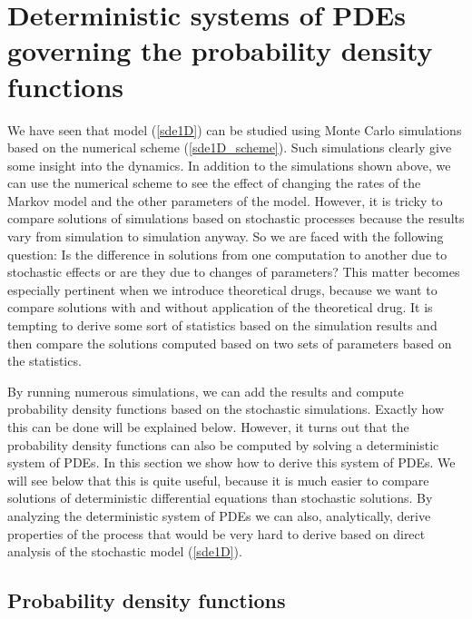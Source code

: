 \section[Probability density functions]{Deterministic systems of PDEs governing the probability density functions}
\label{sec:pdf}

We have seen that model (\ref{sde1D}) can be studied using Monte Carlo simulations based on the numerical scheme (\ref{sde1D_scheme}). Such simulations clearly give some insight into the dynamics. In addition to the simulations shown above, we can use the numerical scheme to see the effect of changing the rates of the Markov model and the other parameters of the model. However, it is tricky to compare solutions of simulations based on stochastic processes because the results vary from simulation to simulation anyway. So we are faced with the following question: Is the difference in solutions from one computation to another due to stochastic effects or are they due to changes of parameters? This matter becomes especially pertinent when we introduce theoretical drugs, because we want to compare solutions with and without application of the theoretical drug. It is tempting to derive some sort of statistics based on the simulation results and then compare the solutions computed based on two sets of parameters based on the statistics.

 By running numerous simulations, we can add the results and compute probability density functions based on the stochastic simulations. Exactly how this can be done will be explained below. However, it turns out that the probability density functions can also be computed by solving a deterministic system of PDEs. In this section we show how to derive this system of PDEs. We will see below that this is quite useful, because it is much easier to compare solutions of deterministic differential equations than  stochastic solutions. By analyzing the deterministic system of PDEs we can also, analytically, derive properties of the process that would be very hard to derive based on direct analysis of the stochastic model (\ref{sde1D}).

\subsection{Probability density functions}


